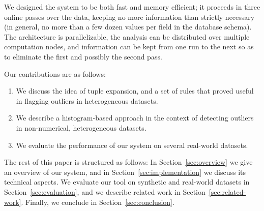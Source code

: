 We designed the system to be both fast and memory efficient; it proceeds in three online passes over the data, keeping no more information than strictly necessary (in general, no more than a few dozen values per field in the database schema). The architecture is parallelizable, the analysis can be distributed over multiple computation nodes, and information can be kept from one run to the next so as to eliminate the first and possibly the second pass.

Our contributions are as follows:
\begin{enumerate}
\item We discuss the idea of tuple expansion, and a set of rules that proved useful in flagging outliers in heterogeneous datasets.
\item We describe a histogram-based approach in the context of detecting outliers in non-numerical, heterogeneous datasets.
\item We evaluate the performance of our system on several real-world datasets.
\end{enumerate}

The rest of this paper is structured as follows: In Section~\ref{sec:overview} we give an overview of our system, and in Section~\ref{sec:implementation} we discuss its technical aspects. We evaluate our tool on synthetic and real-world datasets in Section~\ref{sec:evaluation}, and we describe related work in Section~\ref{sec:related-work}. Finally, we conclude in Section~\ref{sec:conclusion}. %

